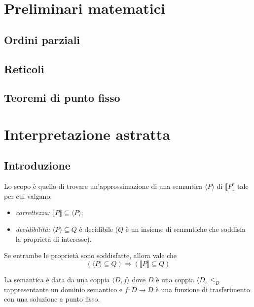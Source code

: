 \documentclass[a4paper, 11pt]{article}
\begin{document}
	\begin{frontespizio}
		\Preambolo{\usepackage{datetime}}
		\Scuola{}
	\end{frontespizio}
	
	\tableofcontents
	\newpage


	\section{Preliminari matematici}
	\subsection{Ordini parziali}
	\subsection{Reticoli}
	\subsection{Teoremi di punto fisso}
	
	\section{Interpretazione astratta}
	\subsection{Introduzione}
	Lo scopo è quello di trovare un'approssimazione di una semantica $\langle P \rangle$ di $\llbracket P \rrbracket$ tale per cui valgano:
	\begin{itemize}
		\item \textit{correttezza:} $\llbracket P \rrbracket \subseteq \langle P \rangle$;
		\item \textit{decidibilità:} $\langle P \rangle \subseteq Q$ è decidibile ($Q$ è un insieme di semantiche che soddisfa la proprietà di interesse).
	\end{itemize}

	Se entrambe le proprietà sono soddisfatte, allora vale che \[ (\langle P \rangle \subseteq Q) \Rightarrow (\llbracket P \rrbracket \subseteq Q) \]
	
	La semantica è data da una coppia $\langle D, f \rangle$ dove $D$ è una coppia $\langle D, \leq_D$ rappresentante un dominio semantico e $f: D \to D$ è una funzione di trasferimento con una soluzione a punto fisso.
	
\end{document}
